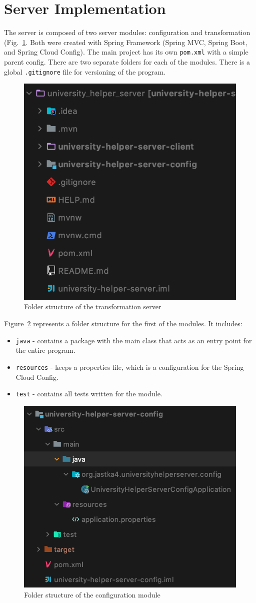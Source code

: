 \section{Server Implementation}
The server is composed of two server modules: configuration and transformation (Fig.~\ref{fig:server-folder-structure}. Both were created with Spring Framework (Spring MVC, Spring Boot, and Spring Cloud Config). The main project has its own \texttt{pom.xml} with a simple parent config. There are two separate folders for each of the modules. There is a global \texttt{.gitignore} file for versioning of the program.

\begin{figure}[htb]
    \centering
    \includegraphics[width=.4\linewidth]{fig04/server-folder-structure.png}
    \caption{Folder structure of the transformation server}
    \label{fig:server-folder-structure}
\end{figure}

Figure~\ref{fig:server-config-folder-structure} represents a folder structure for the first of the modules. It includes:
\begin{itemize}
    \item \texttt{java} - contains a package with the main class that acts as an entry point for the entire program.
    \item \texttt{resources} - keeps a properties file, which is a configuration for the Spring Cloud Config.
    \item \texttt{test} - contains all tests written for the module.
\end{itemize}

\begin{figure}[htb]
    \centering
    \includegraphics[width=.4\linewidth]{fig04/server-config-folder-structure.png}
    \caption{Folder structure of the configuration module}
    \label{fig:server-config-folder-structure}
\end{figure}

